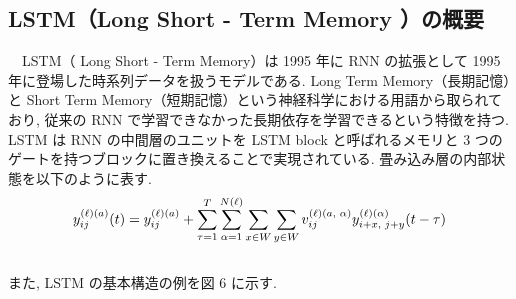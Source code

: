 \subsection{LSTM（Long Short - Term Memory ）の概要}
　LSTM（ Long Short - Term Memory）は 1995 年に RNN の拡張として 1995 年に登場した時系列データを扱うモデルである.
Long Term Memory（長期記憶）と Short Term Memory（短期記憶）という神経科学における用語から取られており,
従来の RNN で学習できなかった長期依存を学習できるという特徴を持つ.
LSTM は RNN の中間層のユニットを LSTM block と呼ばれるメモリと 3 つのゲートを持つブロックに置き換えることで実現されている.
畳み込み層の内部状態を以下のように表す.
\begin{equation}
  \scriptsize
  y^{(\ell) (a)}_{ij}(t) = y^{(\ell) (a)}_{ij} +
  \sum_{\tau = 1}^T \sum_{\alpha=1}^{N(\ell)} \sum_{x \in W} \sum_{y \in W}
  v^{(\ell)(a,\ \alpha)}_{ij}
  y^{(\ell)(\alpha)}_{i + x,\ j + y}(t - \tau)
  \label{eq:LSTM}
\end{equation}\\
また,
LSTM の基本構造の例を図 6 に示す.
